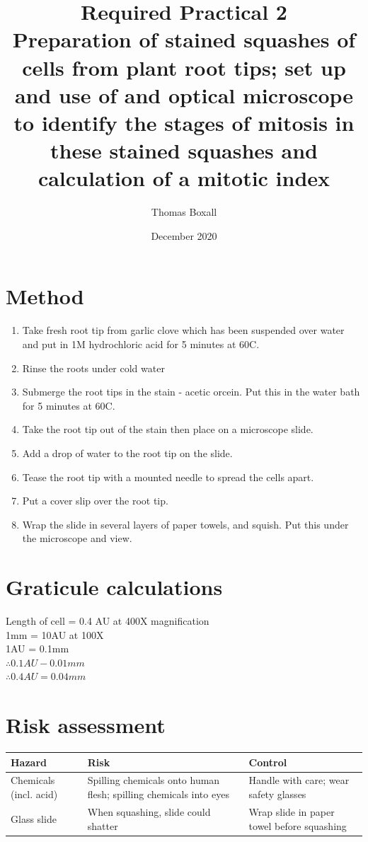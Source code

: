 \documentclass{thomasClass}
\title{\textbf{Required Practical 2}
\\Preparation of stained squashes of cells from plant root tips; set up and use of and optical microscope to identify the stages of mitosis in these stained squashes and calculation of a mitotic index
}
\author{Thomas Boxall}
\date{December 2020}
\begin{document}
\maketitle

\section{Method}
\begin{enumerate}
    \item Take fresh root tip from garlic clove which has been suspended over water and put in 1M hydrochloric acid for 5 minutes at 60\textdegree C.
    \item Rinse the roots under cold water
    \item Submerge the root tips in the stain - acetic orcein. Put this in the water bath for 5 minutes at 60\textdegree C.
    \item Take the root tip out of the stain then place on a microscope slide.
    \item Add a drop of water to the root tip on the slide.
    \item Tease the root tip with a mounted needle to spread the cells apart.
    \item Put a cover slip over the root tip.
    \item Wrap the slide in several layers of paper towels, and squish. Put this under the microscope and view.
\end{enumerate}

\section{Graticule calculations}
Length of cell = 0.4 AU at 400X magnification \\
1mm = 10AU at 100X \\
1AU = 0.1mm \\
$\therefore 0.1AU - 0.01mm$\\
$\therefore 0.4AU = 0.04mm$

\section{Risk assessment}
\begin{table}[H]
    \centering
    \begin{tabularx}{\textwidth}{X|X|X}
        Hazard & Risk & Control\\
        \hline
        Chemicals (incl. acid) & Spilling chemicals onto human flesh; spilling chemicals into eyes & Handle with care; wear safety glasses \\
        Glass slide & When squashing, slide could shatter & Wrap slide in paper towel before squashing
    \end{tabularx}
\end{table}
\end{document}

